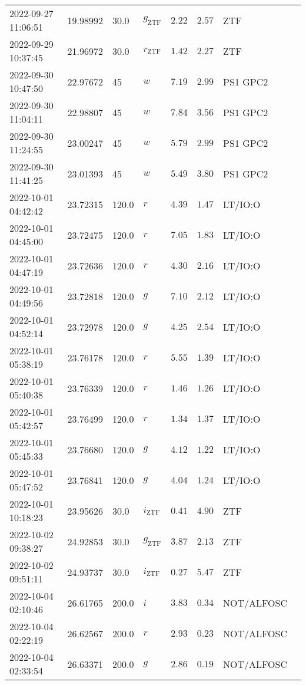 \documentclass{nature_plusfigure}
\begin{document}
\begin{supplement}
\begin{center}
\begin{longtable}{llllllll}
2022-09-27 11:06:51 & 19.98992 & 30.0 & ${g}_\mathrm{ZTF}$ & $2.22$ & $2.57$ & ZTF &  \\ 
2022-09-29 10:37:45 & 21.96972 & 30.0 & ${r}_\mathrm{ZTF}$ & $1.42$ & $2.27$ & ZTF &  \\ 
2022-09-30 10:47:50 & 22.97672 & 45 & $w$ & $7.19$ & $2.99$ & PS1 GPC2 &  \\ 
2022-09-30 11:04:11 & 22.98807 & 45 & $w$ & $7.84$ & $3.56$ & PS1 GPC2 &  \\ 
2022-09-30 11:24:55 & 23.00247 & 45 & $w$ & $5.79$ & $2.99$ & PS1 GPC2 &  \\ 
2022-09-30 11:41:25 & 23.01393 & 45 & $w$ & $5.49$ & $3.80$ & PS1 GPC2 &  \\ 
2022-10-01 04:42:42 & 23.72315 & 120.0 & $r$ & $4.39$ & $1.47$ & LT/IO:O &  \\ 
2022-10-01 04:45:00 & 23.72475 & 120.0 & $r$ & $7.05$ & $1.83$ & LT/IO:O &  \\ 
2022-10-01 04:47:19 & 23.72636 & 120.0 & $r$ & $4.30$ & $2.16$ & LT/IO:O &  \\ 
2022-10-01 04:49:56 & 23.72818 & 120.0 & $g$ & $7.10$ & $2.12$ & LT/IO:O &  \\ 
2022-10-01 04:52:14 & 23.72978 & 120.0 & $g$ & $4.25$ & $2.54$ & LT/IO:O &  \\ 
2022-10-01 05:38:19 & 23.76178 & 120.0 & $r$ & $5.55$ & $1.39$ & LT/IO:O &  \\ 
2022-10-01 05:40:38 & 23.76339 & 120.0 & $r$ & $1.46$ & $1.26$ & LT/IO:O &  \\ 
2022-10-01 05:42:57 & 23.76499 & 120.0 & $r$ & $1.34$ & $1.37$ & LT/IO:O &  \\ 
2022-10-01 05:45:33 & 23.76680 & 120.0 & $g$ & $4.12$ & $1.22$ & LT/IO:O &  \\ 
2022-10-01 05:47:52 & 23.76841 & 120.0 & $g$ & $4.04$ & $1.24$ & LT/IO:O &  \\ 
2022-10-01 10:18:23 & 23.95626 & 30.0 & ${i}_\mathrm{ZTF}$ & $0.41$ & $4.90$ & ZTF &  \\ 
2022-10-02 09:38:27 & 24.92853 & 30.0 & ${g}_\mathrm{ZTF}$ & $3.87$ & $2.13$ & ZTF &  \\ 
2022-10-02 09:51:11 & 24.93737 & 30.0 & ${i}_\mathrm{ZTF}$ & $0.27$ & $5.47$ & ZTF &  \\ 
2022-10-04 02:10:46 & 26.61765 & 200.0 & $i$ & $3.83$ & $0.34$ & NOT/ALFOSC &  \\ 
2022-10-04 02:22:19 & 26.62567 & 200.0 & $r$ & $2.93$ & $0.23$ & NOT/ALFOSC &  \\ 
2022-10-04 02:33:54 & 26.63371 & 200.0 & $g$ & $2.86$ & $0.19$ & NOT/ALFOSC &  \\ 

\end{longtable}
\end{center}
\end{supplement}
\end{document}
